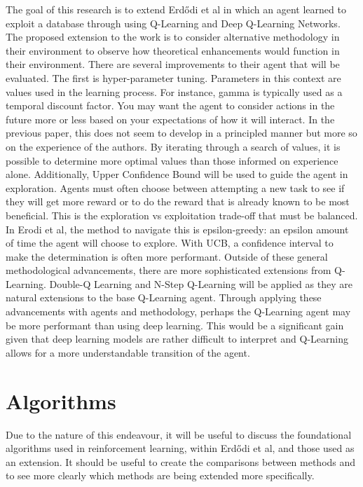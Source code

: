 \documentclass[conference]{IEEEtran}
\begin{document}
The goal of this research is to extend Erdődi et al in which an agent learned to exploit a database through using Q-Learning and Deep Q-Learning Networks. The proposed extension to the work is to consider alternative methodology in their environment to observe how theoretical enhancements would function in their environment. There are several improvements to their agent that will be evaluated. The first is hyper-parameter tuning. Parameters in this context are values used in the learning process. For instance, gamma is typically used as a temporal discount factor. You may want the agent to consider actions in the future more or less based on your expectations of how it will interact. In the previous paper, this does not seem to develop in a principled manner but more so on the experience of the authors. By iterating through a search of values, it is possible to determine more optimal values than those informed on experience alone. Additionally, Upper Confidence Bound will be used to guide the agent in exploration. Agents must often choose between attempting a new task to see if they will get more reward or to do the reward that is already known to be most beneficial. This is the exploration vs exploitation trade-off that must be balanced. In Erodi et al, the method to navigate this is epsilon-greedy: an epsilon amount of time the agent will choose to explore. With UCB, a confidence interval to make the determination is often more performant. Outside of these general methodological advancements, there are more sophisticated extensions from Q-Learning. Double-Q Learning and N-Step Q-Learning will be applied as they are natural extensions to the base Q-Learning agent. Through applying these advancements with agents and methodology, perhaps the Q-Learning agent may be more performant than using deep learning. This would be a significant gain given that deep learning models are rather difficult to interpret and Q-Learning allows for a more understandable transition of the agent. 

\section{Algorithms}
\vspace{-3mm}
Due to the nature of this endeavour, it will be useful to discuss the foundational algorithms used in reinforcement learning, within Erdődi et al, and those used as an extension. It should be useful to create the comparisons between methods and to see more clearly which methods are being extended more specifically. 
\end{document}
